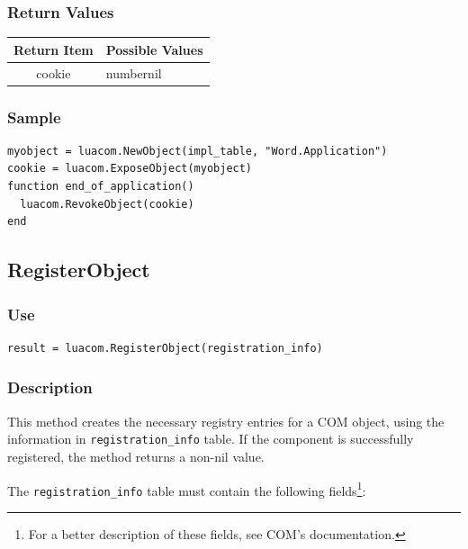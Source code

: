 \documentclass[11pt,a4paper,english]{report}
\begin{document}
\subsubsection*{Return Values}

\begin{tabular}{|c|p{4cm}|}
\hline
\bf Return Item & \bf Possible Values \\ \hline \hline
cookie  & number\newline nil \\ \hline
\end{tabular}

\subsubsection*{Sample}

\begin{verbatim}
myobject = luacom.NewObject(impl_table, "Word.Application")
cookie = luacom.ExposeObject(myobject)
function end_of_application()
  luacom.RevokeObject(cookie)
end
\end{verbatim}


\subsection*{RegisterObject}

\subsubsection*{Use}

\begin{verbatim}
result = luacom.RegisterObject(registration_info)
\end{verbatim}

\subsubsection*{Description}
This method creates the necessary registry entries for a COM object,
using the information in \texttt{registration\_info} table. If the
component is successfully registered, the method returns a non-nil
value.

The \texttt{registration\_info} table must contain the following
fields\footnote{For a better description of these fields, see COM's
documentation.}:
\end{document}
